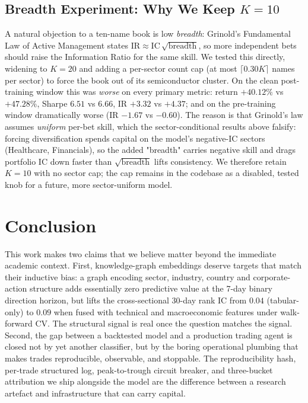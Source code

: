 \documentclass[10pt,journal,compsoc]{IEEEtran}
\begin{document}
\subsection{Breadth Experiment: Why We Keep $K{=}10$}
A natural objection to a ten-name book is low \emph{breadth}: Grinold's Fundamental Law of Active Management states $\text{IR} \approx \text{IC}\,\sqrt{\text{breadth}}$, so more independent bets should raise the Information Ratio for the same skill. We tested this directly, widening to $K{=}20$ and adding a per-sector count cap (at most $\lceil 0.30K \rceil$ names per sector) to force the book out of its semiconductor cluster. On the clean post-training window this was \emph{worse} on every primary metric: return $+40.12\%$ vs $+47.28\%$, Sharpe $6.51$ vs $6.66$, IR $+3.32$ vs $+4.37$; and on the pre-training window dramatically worse (IR $-1.67$ vs $-0.60$). The reason is that Grinold's law assumes \emph{uniform} per-bet skill, which the sector-conditional results above falsify: forcing diversification spends capital on the model's negative-IC sectors (Healthcare, Financials), so the added "breadth" carries negative skill and drags portfolio IC down faster than $\sqrt{\text{breadth}}$ lifts consistency. We therefore retain $K{=}10$ with no sector cap; the cap remains in the codebase as a disabled, tested knob for a future, more sector-uniform model.

\section{Conclusion}
This work makes two claims that we believe matter beyond the immediate academic context. First, knowledge-graph embeddings deserve targets that match their inductive bias: a graph encoding sector, industry, country and corporate-action structure adds essentially zero predictive value at the 7-day binary direction horizon, but lifts the cross-sectional 30-day rank IC from $0.04$ (tabular-only) to $0.09$ when fused with technical and macroeconomic features under walk-forward CV. The structural signal is real once the question matches the signal. Second, the gap between a backtested model and a production trading agent is closed not by yet another classifier, but by the boring operational plumbing that makes trades reproducible, observable, and stoppable. The reproducibility hash, per-trade structured log, peak-to-trough circuit breaker, and three-bucket attribution we ship alongside the model are the difference between a research artefact and infrastructure that can carry capital.
\end{document}
